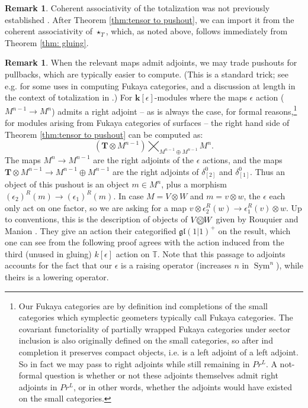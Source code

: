 \documentclass{article}
\DeclareMathOperator{\Sym}{Sym}
\newcommand{\ootimes}{
\ooalign{$\otimes$\cr\hidewidth$\bigcirc$\hidewidth}}
\theoremstyle{definition}
\newtheorem{remark}[theorem]{Remark}
\begin{document}
\begin{remark}
    Coherent associativity of the totalization was not previously established 
    \cite[Remark 4.4.4]{Christ-Dyckerhoff-Walde}.  After Theorem \ref{thm:tensor to pushout}, we can  import it from  the coherent associativity of $\star_T$, which, as noted above, follows immediately from Theorem \ref{thm: gluing}.    
\end{remark}
\begin{remark} \label{rem: RM versus CDW} 
    When the relevant maps admit adjoints, we may  trade pushouts for pullbacks, which are typically easier to compute.  (This is a standard trick; see e.g. \cite{nadler2016wrapped, gammage-shende} for some uses in computing Fukaya categories, and a discussion at length in the context of totalization in \cite{Christ-Dyckerhoff-Walde}.)  For $\mathbf{k}[\epsilon]$-modules where the maps  $\epsilon$ action ($M^{n-1} \to M^n$) admits a right adjoint -- as is always the case, for formal reasons,\footnote{Our Fukaya categories are by definition ind completions of the small categories which symplectic geometers typically call Fukaya categories.  The covariant functoriality  of partially wrapped Fukaya categories under sector inclusion is also originally defined on the small categories, so after ind completion it preserves compact objects, i.e. is a  left adjoint of a left adjoint.  So in fact we may pass to right adjoints while still remaining in $Pr^L$.  A not-formal question is whether or not these adjoints themselves admit right adjoints in $Pr^L$, or in other words, whether the adjoints would have existed on the small categories.} for modules  arising from Fukaya categories of surfaces -- the right hand side of Theorem \ref{thm:tensor to pushout} can be computed as:
    $$(\mathbf{T} \otimes M^{n-1}) \!\!\!\!\! \!\!\!  \bigtimes_{M^{n-1} \oplus M^{n-1}}  
    \!\!\!\!\!\!\!\!  M^n.$$ 
    The maps $M^n \to M^{n-1}$ are the right adjoints of the $\epsilon$ actions, and the maps $\mathbf{T} \otimes M^{n-1} \to M^{n-1} \oplus M^{n-1}$ are the right adjoints of $\delta^0_{[2]}$ and $\delta^0_{[1]}$.  Thus an object of this pushout is an object $m \in M^n$, plus a morphism $(\epsilon_2)^R(m) \to (\epsilon_1)^R(m)$.  
    In case $M = V \otimes W$ and $m = v \otimes w$, the $\epsilon$ each only act on one factor, so we are asking for a map $v \otimes \epsilon_2^R(w) \to \epsilon_1^R(v) \otimes w$.  Up to  conventions, this is   the  description of objects of $V \ootimes W$ given by Rouquier and Manion \cite[p.  6]{rouquier-manion}.  They give an action their categorified $\mathfrak{gl}(1|1)^+$ on the result, which one can see from the following proof agrees with the action induced from the third (unused in gluing) $k[\epsilon]$ action on $\mathbb{T}$.  Note that this passage to adjoints accounts for the fact that our $\epsilon$ is a raising operator (increases $n$ in $\Sym^n$), while theirs is a lowering operator.  
\end{remark}
\end{document}
